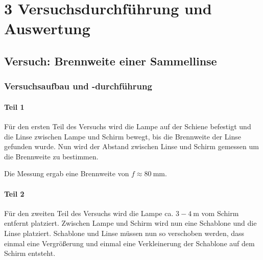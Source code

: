 \chapter*{3 Versuchsdurchführung und Auswertung}
\setcounter{chapter}{3}
\setcounter{section}{0}
\setcounter{subsection}{0}

\section{Versuch: Brennweite einer Sammellinse}

\subsection{Versuchsaufbau und -durchführung}


    \subsubsection{Teil 1}
    
        Für den ersten Teil des Versuchs wird die Lampe auf der Schiene befestigt und die Linse zwischen Lampe und Schirm bewegt, bis die Brennweite der Linse gefunden wurde. Nun wird der Abstand zwischen Linse und Schirm gemessen um die Brennweite zu bestimmen.

        Die Messung ergab eine Brennweite von $f \approx 80\ \mathrm{mm}$.

    \subsubsection{Teil 2}
    
        Für den zweiten Teil des Versuchs wird die Lampe ca. $3 - 4\ \mathrm{m}$ vom Schirm entfernt platziert. Zwischen Lampe und Schirm wird nun eine Schablone und die Linse platziert. Schablone und Linse müssen nun so verschoben werden, dass einmal eine Vergrößerung und einmal eine Verkleinerung der Schablone auf dem Schirm entsteht.

